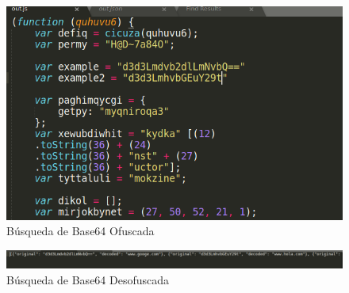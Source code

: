 \documentclass[15pt]{article}
\begin{document}
	
	\begin{figure}[H]
		\centering
		\includegraphics[width=12cm]{images/base64_before.png}
		\caption{Búsqueda de Base64 Ofuscada} 
	\end{figure}
	
	\begin{figure}[H]
		\centering
		\includegraphics[width=18cm]{images/base64_after.png}
		\caption{Búsqueda de Base64 Desofuscada} 
	\end{figure}

	
	\newpage
	\listoffigures
	\lstlistoflistings
	\newpage
\end{document}
